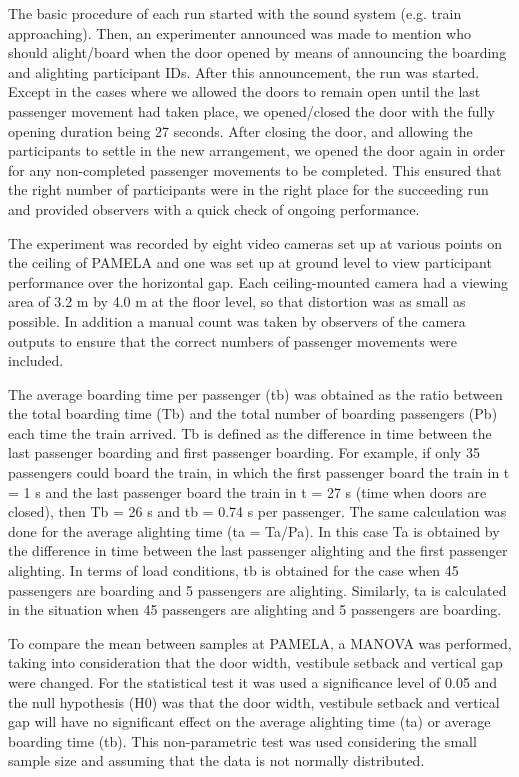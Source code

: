 The basic procedure of each run started with the sound system (e.g. train approaching). Then, an experimenter announced was made to mention who should alight/board when the door opened by means of announcing the boarding and alighting participant IDs. After this announcement, the run was started. Except in the cases where we allowed the doors to remain open until the last passenger movement had taken place, we opened/closed the door with the fully opening duration being 27 seconds. After closing the door, and allowing the participants to settle in the new arrangement, we opened the door again in order for any non-completed passenger movements to be completed. This ensured that the right number of participants were in the right place for the succeeding run and provided observers with a quick check of ongoing performance.

The experiment was recorded by eight video cameras set up at various points on the ceiling of PAMELA and one was set up at ground level to view participant performance over the horizontal gap. Each ceiling-mounted camera had a viewing area of 3.2 m by 4.0 m at the floor level, so that distortion was as small as possible. In addition a manual count was taken by observers of the camera outputs to ensure that the correct numbers of passenger movements were included.

The average boarding time per passenger (tb) was obtained as the ratio between the total boarding time (Tb) and the total number of boarding passengers (Pb) each time the train arrived. Tb is defined as the difference in time between the last passenger boarding and first passenger boarding. For example, if only 35 passengers could board the train, in which the first passenger board the train in t = 1 s and the last passenger board the train in t = 27 s (time when doors are closed), then Tb = 26 s and tb = 0.74 s per passenger. The same calculation was done for the average alighting time (ta = Ta/Pa). In this case Ta is obtained by the difference in time between the last passenger alighting and the first passenger alighting. In terms of load conditions, tb is obtained for the case when 45 passengers are boarding and 5 passengers are alighting. Similarly, ta is calculated in the situation when 45 passengers are alighting and 5 passengers are boarding. 

To compare the mean between samples at PAMELA, a MANOVA was performed, taking into consideration that the door width, vestibule setback and vertical gap were changed. For the statistical test it was used a significance level of 0.05 and the null hypothesis (H0) was that the door width, vestibule setback and vertical gap will have no significant effect on the average alighting time (ta) or average boarding time (tb). This non-parametric test was used considering the small sample size and assuming that the data is not normally distributed.

